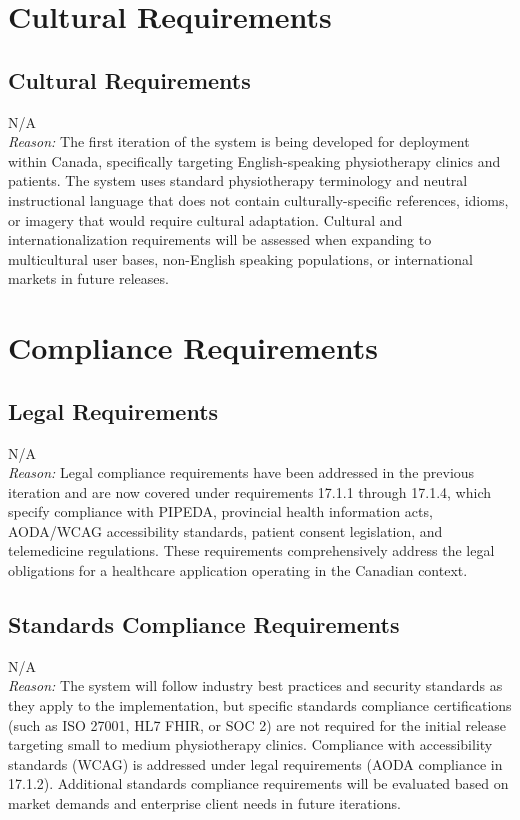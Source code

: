 \documentclass[12pt]{article}
\begin{document}
\section{Cultural Requirements}

\subsection{Cultural Requirements}
\noindent N/A \\
\textit{Reason:} The first iteration of the system is being developed for deployment within Canada, specifically targeting English-speaking physiotherapy clinics and patients. The system uses standard physiotherapy terminology and neutral instructional language that does not contain culturally-specific references, idioms, or imagery that would require cultural adaptation. Cultural and internationalization requirements will be assessed when expanding to multicultural user bases, non-English speaking populations, or international markets in future releases.

\section{Compliance Requirements}

\subsection{Legal Requirements}
\noindent N/A \\
\textit{Reason:} Legal compliance requirements have been addressed in the previous iteration and are now covered under requirements 17.1.1 through 17.1.4, which specify compliance with PIPEDA, provincial health information acts, AODA/WCAG accessibility standards, patient consent legislation, and telemedicine regulations. These requirements comprehensively address the legal obligations for a healthcare application operating in the Canadian context.

\subsection{Standards Compliance Requirements}
\noindent N/A \\
\textit{Reason:} The system will follow industry best practices and security standards as they apply to the implementation, but specific standards compliance certifications (such as ISO 27001, HL7 FHIR, or SOC 2) are not required for the initial release targeting small to medium physiotherapy clinics. Compliance with accessibility standards (WCAG) is addressed under legal requirements (AODA compliance in 17.1.2). Additional standards compliance requirements will be evaluated based on market demands and enterprise client needs in future iterations.
\end{document}
